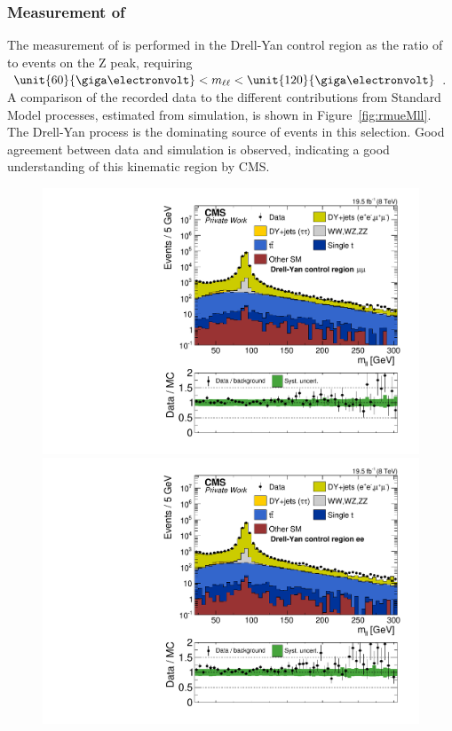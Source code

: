 \subsubsection{Measurement of \rmue}
The measurement of \rmue is performed in the Drell-Yan control region as the ratio of \MM to \EE events on the Z peak, requiring $\unit{60}{\giga\electronvolt} < \mll < \unit{120}{\giga\electronvolt}$. A comparison of the recorded data to the different contributions  from Standard Model processes, estimated from simulation, is shown in Figure~\ref{fig:rmueMll}. The Drell-Yan process is the dominating source of events in this selection. Good agreement between data and simulation is observed, indicating a good understanding of this kinematic region by CMS.   
\begin{figure}[htbp]
\centering
\begin{minipage}[t]{0.49\textwidth}
  \includegraphics[width=\textwidth]{plots/BG/rmue/DrellYanControl_Mll_Full2012_MuMu_TopReweighted.pdf}
\end{minipage}
\begin{minipage}[t]{0.49\textwidth}
\includegraphics[width=\textwidth]{plots/BG/rmue/DrellYanControl_Mll_Full2012_EE_TopReweighted.pdf}

\end{minipage}
\end{figure}
